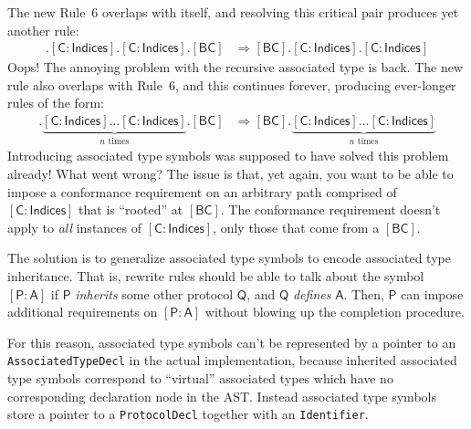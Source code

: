 \documentclass[a4paper,headsepline,bibliography=totoc,toc=flat,fleqn,twoside=semi]{scrbook}
\theoremstyle{definition}
\theoremstyle{definition}
\theoremstyle{definition}
\newcommand{\namesym}[1]{\mathsf{#1}}
\newcommand{\proto}[1]{\bm{\mathsf{#1}}}
\newcommand{\protosym}[1]{[\proto{#1}]}
\newcommand{\assocsym}[2]{[\proto{#1}\colon\namesym{#2}]}
\begin{document}
The new Rule~6 overlaps with itself, and resolving this critical pair produces yet another rule:
\begin{align*}
\protosym{BC}.\assocsym{C}{Indices}.\assocsym{C}{Indices}.\protosym{BC}&\Rightarrow\protosym{BC}.\assocsym{C}{Indices}.\assocsym{C}{Indices}
\end{align*}
Oops! The annoying problem with the recursive associated type is back. The new rule also overlaps with Rule~6, and this continues forever, producing ever-longer rules of the form:
\begin{align*}
\protosym{BC}.\underbrace{\assocsym{C}{Indices}\ldots\assocsym{C}{Indices}}_{\text{$n$ times}}.\protosym{BC}
&\Rightarrow\protosym{BC}.\underbrace{\assocsym{C}{Indices}\ldots\assocsym{C}{Indices}}_{\text{$n$ times}}
\end{align*}
Introducing associated type symbols was supposed to have solved this problem already! What went wrong? The issue is that, yet again, you want to be able to impose a conformance requirement on an arbitrary path comprised of $\assocsym{C}{Indices}$ that is ``rooted'' at $\protosym{BC}$. The conformance requirement doesn't apply to \emph{all} instances of $\assocsym{C}{Indices}$, only those that come from a $\protosym{BC}$.

The solution is to generalize associated type symbols to encode associated type inheritance. That is, rewrite rules should be able to talk about the symbol $\assocsym{P}{A}$ if $\proto{P}$ \emph{inherits} some other protocol $\proto{Q}$, and $\proto{Q}$ \emph{defines} $\namesym{A}$. Then, $\proto{P}$ can impose additional requirements on $\assocsym{P}{A}$ without blowing up the completion procedure.

For this reason, associated type symbols can't be represented by a pointer to an \texttt{AssociatedTypeDecl} in the actual implementation, because inherited associated type symbols correspond to ``virtual'' associated types which have no corresponding declaration node in the AST. Instead associated type symbols store a pointer to a \texttt{ProtocolDecl} together with an \texttt{Identifier}.
\end{document}
